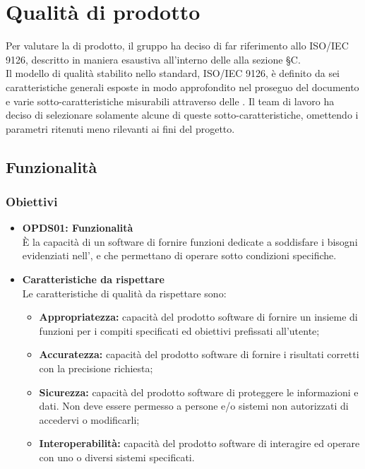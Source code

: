 \section{Qualità di prodotto}
\label{qualità_prodotto}
Per valutare la  di prodotto, il gruppo {\Gruppo} ha deciso di far riferimento allo  ISO/IEC 9126, descritto in maniera esaustiva all'interno delle  alla sezione \S{C}.\\
Il modello di qualità stabilito nello standard, ISO/IEC 9126, è definito da sei caratteristiche generali esposte in modo approfondito nel proseguo del documento e varie sotto-caratteristiche misurabili attraverso delle . Il team di lavoro ha deciso di selezionare solamente alcune di queste sotto-caratteristiche, omettendo i parametri ritenuti meno rilevanti ai fini del progetto.
\subsection{Funzionalità}
\subsubsection{Obiettivi}
\begin{itemize}
	\item \textbf{OPDS01: Funzionalità}\\
	È la capacità di un software di fornire funzioni dedicate a soddisfare i bisogni evidenziati nell'\AdR{}, e che permettano di operare sotto  condizioni specifiche.
	\item \textbf{Caratteristiche da rispettare}\\
	Le caratteristiche di qualità da rispettare sono:
	\begin{itemize}
		\item \textbf{Appropriatezza:} capacità del prodotto software di fornire un insieme di funzioni per i compiti specificati ed obiettivi prefissati all'utente;
		\item \textbf{Accuratezza:} capacità del prodotto software di fornire i risultati corretti con la precisione richiesta;
		\item \textbf{Sicurezza:} capacità del prodotto software di proteggere le informazioni e dati. Non deve essere permesso a persone e/o sistemi non autorizzati di accedervi o modificarli;
		\item \textbf{Interoperabilità:} capacità del prodotto software di interagire ed operare con uno o diversi sistemi specificati.
	\end{itemize}
\end{itemize}
